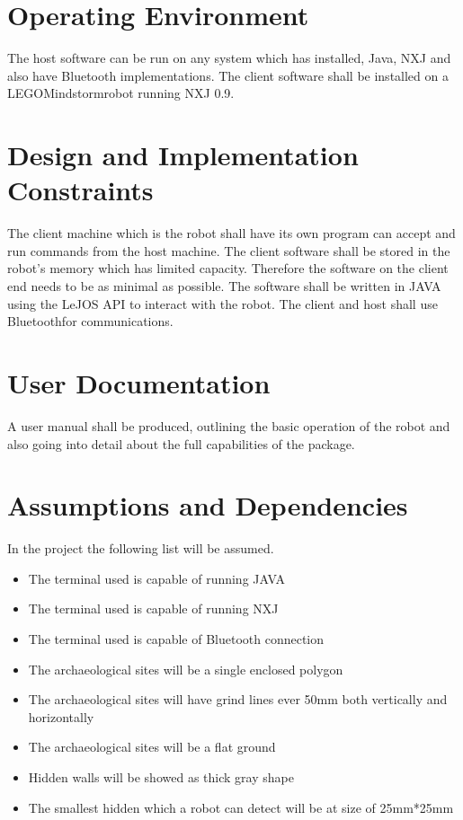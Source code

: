 \documentclass[11pt, a4paper]{report}
\begin{document}
\section{Operating Environment}
The host software can be run on any system which has installed, Java, NXJ and also have Bluetooth implementations.
The client software shall be installed on a LEGO\textregistered Mindstorm\textregistered  robot running NXJ 0.9.

\section{Design and Implementation Constraints}
The client machine which is the robot shall have its own program can accept and run commands from the host machine. The client software shall be stored in the robot's memory which has limited capacity. Therefore the software on the client end needs to be as minimal as possible.
The software shall be written in JAVA using the LeJOS API to interact with the robot.
The client and host shall use Bluetooth\textregistered  for communications.

\section{User Documentation}
A user manual shall be produced, outlining the basic operation of the robot and also going into detail about the full capabilities of the package.


\section{Assumptions and Dependencies}
In the project the following list will be assumed.

\begin{itemize}
  \item{The terminal used is capable of running JAVA}
  \item{The terminal used is capable of running NXJ}
  \item{The terminal used is capable of Bluetooth connection}
  \item{The archaeological sites will be a single enclosed polygon}
  \item{The archaeological sites will have grind lines ever 50mm both vertically and horizontally}
  \item{The archaeological sites will be a flat ground}
  \item{Hidden walls will be showed as thick gray shape}
  \item{The smallest hidden which a robot can detect will be at size of 25mm*25mm}
\end{itemize}
\end{document}
